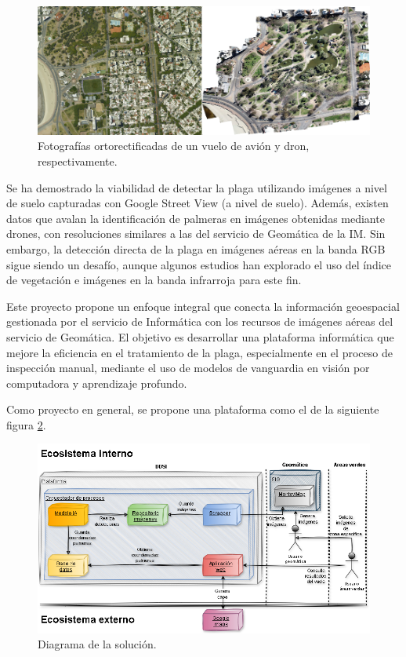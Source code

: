 \documentclass[
11pt, %
]{charter}
\begin{document}
\begin{figure}[H]
  \centering
  \includegraphics[width=.95\textwidth]{./Figuras/imagen-dron-y-avion.png}
  \caption{Fotografías ortorectificadas de un vuelo de avión y dron, respectivamente.}
  \label{fig:imagen-dron-y-avion}
\end{figure}

Se ha demostrado la viabilidad de detectar la plaga utilizando imágenes a nivel de suelo capturadas con Google Street View (a nivel de suelo). Además, existen datos que avalan la identificación de palmeras en imágenes obtenidas mediante drones, con resoluciones similares a las del servicio de Geomática de la IM. Sin embargo, la detección directa de la plaga en imágenes aéreas en la banda RGB sigue siendo un desafío, aunque algunos estudios han explorado el uso del índice de vegetación e imágenes en la banda infrarroja para este fin.

Este proyecto propone un enfoque integral que conecta la información geoespacial gestionada por el servicio de Informática con los recursos de imágenes aéreas del servicio de Geomática. El objetivo es desarrollar una plataforma informática que mejore la eficiencia en el tratamiento de la plaga, especialmente en el proceso de inspección manual, mediante el uso de modelos de vanguardia en visión por computadora y aprendizaje profundo.

Como proyecto en general, se propone una plataforma como el de la siguiente figura \ref{fig:bosquejo-inicial-solucion}.

\begin{figure}[H]
  \centering
  \includegraphics[width=.95\textwidth]{./Figuras/bosquejo-inicial-solucion.png}
  \caption{Diagrama de la solución.}
  \label{fig:bosquejo-inicial-solucion}
\end{figure}
\end{document}
